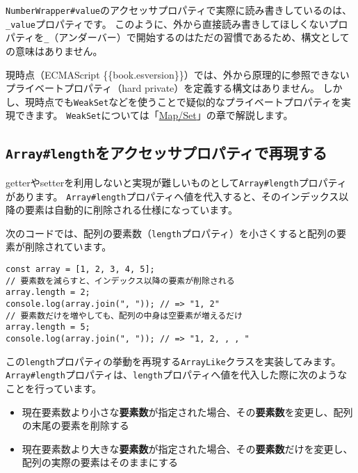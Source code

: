 \begin{tcolorbox}[title=プライベートプロパティ]\label{private-property}

\texttt{NumberWrapper\#value}のアクセッサプロパティで実際に読み書きしているのは、\texttt{\_value}プロパティです。
このように、外から直接読み書きしてほしくないプロパティを\texttt{\_}（アンダーバー）で開始するのはただの習慣であるため、構文としての意味はありません。

現時点（ECMAScript
\{\{book.esversion\}\}）では、外から原理的に参照できないプライベートプロパティ（hard
private）を定義する構文はありません。
しかし、現時点でも\texttt{WeakSet}などを使うことで疑似的なプライベートプロパティを実現できます。
\texttt{WeakSet}については「\href{../map-and-set/README.md}{Map/Set}」の章で解説します。
\end{tcolorbox}

\hypertarget{array-like-length}{%
\subsection{\texorpdfstring{\texttt{Array\#length}をアクセッサプロパティで再現する}{Array\#lengthをアクセッサプロパティで再現する}}\label{array-like-length}}

getterやsetterを利用しないと実現が難しいものとして\texttt{Array\#length}プロパティがあります。
\texttt{Array\#length}プロパティへ値を代入すると、そのインデックス以降の要素は自動的に削除される仕様になっています。

次のコードでは、配列の要素数（\texttt{length}プロパティ）を小さくすると配列の要素が削除されています。

\begin{lstlisting}
const array = [1, 2, 3, 4, 5];
// 要素数を減らすと、インデックス以降の要素が削除される
array.length = 2;
console.log(array.join(", ")); // => "1, 2"
// 要素数だけを増やしても、配列の中身は空要素が増えるだけ
array.length = 5;
console.log(array.join(", ")); // => "1, 2, , , "
\end{lstlisting}

この\texttt{length}プロパティの挙動を再現する\texttt{ArrayLike}クラスを実装してみます。
\texttt{Array\#length}プロパティは、\texttt{length}プロパティへ値を代入した際に次のようなことを行っています。

\begin{itemize}
\item
  現在要素数より小さな\textbf{要素数}が指定された場合、その\textbf{要素数}を変更し、配列の末尾の要素を削除する
\item
  現在要素数より大きな\textbf{要素数}が指定された場合、その\textbf{要素数}だけを変更し、配列の実際の要素はそのままにする
\end{itemize}

